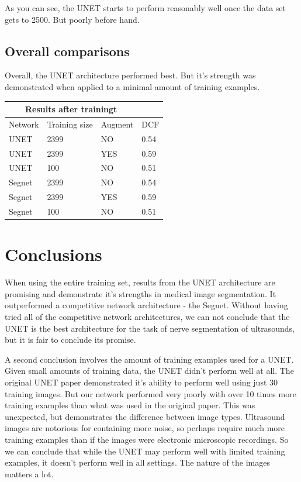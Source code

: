 \documentclass[letterpaper]{article}
\begin{document}
As you can see, the UNET starts to perform reasonably well once the data set gets to 2500. But poorly before hand. 

\subsection{Overall comparisons}
Overall, the UNET architecture performed best. But it's strength was demonstrated when applied to a minimal amount of training examples. 

\begin{tabular}{ |p{1.5cm}||p{2cm}|p{1.5cm}|p{1cm}|  }
 \hline
 \multicolumn{3}{|c|}{Results after trainingt} \\
 \hline
Network    & Training size & Augment & DCF \\
 \hline
 UNET   & 2399    & NO & 0.54\\
 UNET   & 2399    & YES & 0.59\\
 UNET   & 100    & NO & 0.51\\ 
 Segnet   & 2399    & NO & 0.54\\
 Segnet   & 2399    & YES & 0.59\\
 Segnet   & 100    & NO & 0.51\\ 
 \hline
\end{tabular}



\section{Conclusions}
When using the entire training set, results from the UNET architecture are promising and demonstrate it's strengths in medical image segmentation. It outperformed a competitive network architecture - the Segnet. Without having tried all of the competitive network architectures, we can not conclude that the UNET is the best architecture for the task of nerve segmentation of ultrasounds, but it is fair to conclude its promise. 

A second conclusion involves the amount of training examples used for a UNET. Given small amounts of training data, the UNET didn't perform well at all. The original UNET paper demonstrated it's ability to perform well using just 30 training images. But our network performed very poorly with over 10 times more training examples than what was used in the original paper. This was unexpected, but demonstrates the difference between image types. Ultrasound images are notorious for containing more noise, so perhaps require much more training examples than if the images were electronic microscopic recordings. So we can conclude that while the UNET may perform well with limited training examples, it doesn't perform well in all settings. The nature of the images matters a lot.
\end{document}
